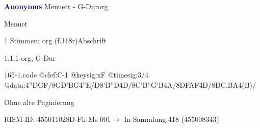 \documentclass[twocolumn, 12pt]{book}
\begin{document}
\par \vspace{16pt} \textcolor{darkblue}{\textbf{Anonymus  }}\hfillplus{\textbf{[165]}}\newline Menuett - G-Dur\newline org
\par \begin{itshape}[f.118r, heading:] Menuet\end{itshape} 
\par \textcolor{darkblue}{}  1 Stimmen: org  (f.118r)\newline Abschrift
\par 1.1.1  org, G-Dur  
\begin{filecontents*}{165-1.code}
@clef:C-1
@keysig:xF
@timesig:3/4
@data:4''DGF/{8GD'BG}4''E/D{8'B''D}4D/{8C'B''G'B}4A/{8DF}{AF}4D/{8DC,BA}4(B)/
\end{filecontents*}
\newline %
\par Ohne alte Paginierung
\par RISM-ID: 455011028\newline D-Fh  Ms 001\newline $\rightarrow$ In Sammlung 418 (455008343)
      
\end{document}
